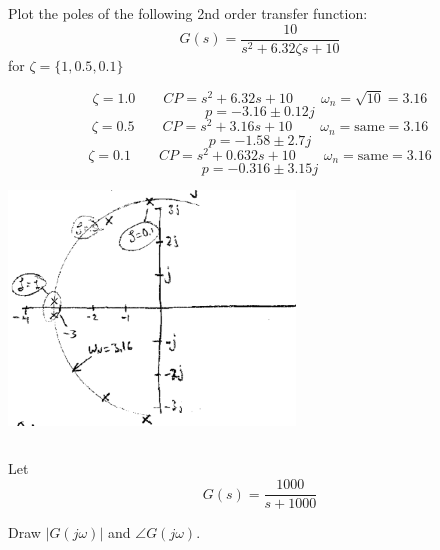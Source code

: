 \documentclass{article}	%
\begin{document}



\subsection{}
Plot the poles of the following 2nd order transfer function:
\[
G(s) = \frac{10}{s^2 + 6.32\zeta s + 10}
\]
for $\zeta = \{ 1, 0.5, 0.1 \}$

\begin{solution}
\[
\zeta = 1.0 \qquad CP = s^2+6.32s+10 \qquad \omega_n = \sqrt{10} = 3.16
\]
\[
p = -3.16\pm 0.12j
\]
\[
\zeta = 0.5 \qquad CP = s^2+3.16s+10 \qquad \omega_n = \mathrm{same}  = 3.16
\]
\[
p = -1.58\pm 2.7j
\]
\[
\zeta = 0.1 \qquad CP = s^2+0.632s+10 \qquad \omega_n = \mathrm{same}  = 3.16
\]
\[
p = -0.316\pm 3.15j
\]

\includegraphics[width=3.0in]{00948a.png}

\end{solution}



\subsection{}
Let
\[
G(s) = \frac{1000}{s+1000}
\]

Draw $|G(j\omega)|$ and $\angle G(j\omega)$.
\end{document}
